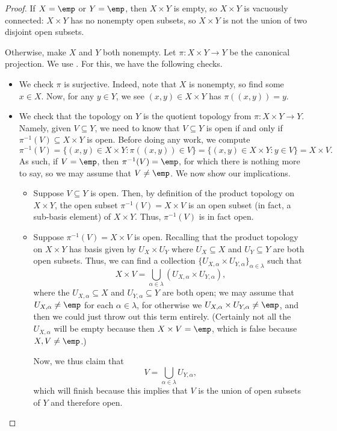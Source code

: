 \documentclass[../notes.tex]{subfiles}
\begin{document}
\begin{proof}
	If $X=\emp$ or $Y=\emp$, then $X\times Y$ is empty, so $X\times Y$ is vacuously connected: $X\times Y$ has no nonempty open subsets, so $X\times Y$ is not the union of two disjoint open subsets.
	
	Otherwise, make $X$ and $Y$ both nonempty. {Let $\pi\colon X\times Y\to Y$ be the canonical projection. We use .} For this, we have the following checks.
	\begin{itemize}
		\item We check $\pi$ is surjective. Indeed, note that $X$ is nonempty, so find some $x\in X$. Now, for any $y\in Y$, we see $(x,y)\in X\times Y$ has $\pi((x,y))=y$.
		\item We check that the topology on $Y$ is the quotient topology from $\pi\colon X\times Y\to Y$. Namely, given $V\subseteq Y$, we need to know that $V\subseteq Y$ is open if and only if $\pi^{-1}(V)\subseteq X\times Y$ is open. Before doing any work, we compute
		\[\pi^{-1}(V)=\{(x,y)\in X\times Y:\pi((x,y))\in V\}=\{(x,y)\in X\times Y:y\in V\}=X\times V.\]
		As such, if $V=\emp$, then $\pi^{-1}(V)=\emp$, for which there is nothing more to say, so we may assume that $V\ne\emp$. We now show our implications.
		\begin{itemize}
			\item Suppose $V\subseteq Y$ is open. Then, by definition of the product topology on $X\times Y$, the open subset $\pi^{-1}(V)=X\times V$ is an open subset (in fact, a sub-basis element) of $X\times Y$. Thus, $\pi^{-1}(V)$ is in fact open.
			\item Suppose $\pi^{-1}(V)=X\times V$ is open. Recalling that the product topology on $X\times Y$ has basis given by $U_X\times U_Y$ where $U_X\subseteq X$ and $U_Y\subseteq Y$ are both open subsets. Thus, we can find a collection $\{U_{X,\alpha}\times U_{Y,\alpha}\}_{\alpha\in\lambda}$ such that
			\[X\times V=\bigcup_{\alpha\in\lambda}(U_{X,\alpha}\times U_{Y,\alpha}),\]
			where the $U_{X,\alpha}\subseteq X$ and $U_{Y,\alpha}\subseteq Y$ are both open; we may assume that $U_{X,\alpha}\ne\emp$ for each $\alpha\in\lambda$, for otherwise we $U_{X,\alpha}\times U_{Y,\alpha}\ne\emp$, and then we could just throw out this term entirely. (Certainly not all the $U_{X,\alpha}$ will be empty because then $X\times V=\emp$, which is false because $X,V\ne\emp$.)
			
			Now, we thus claim that
			\[V=\bigcup_{\alpha\in\lambda}U_{Y,\alpha},\]
			which will finish because this implies that $V$ is the union of open subsets of $Y$ and therefore open.
			

\end{itemize}
\end{itemize}
\end{proof}
\end{document}
